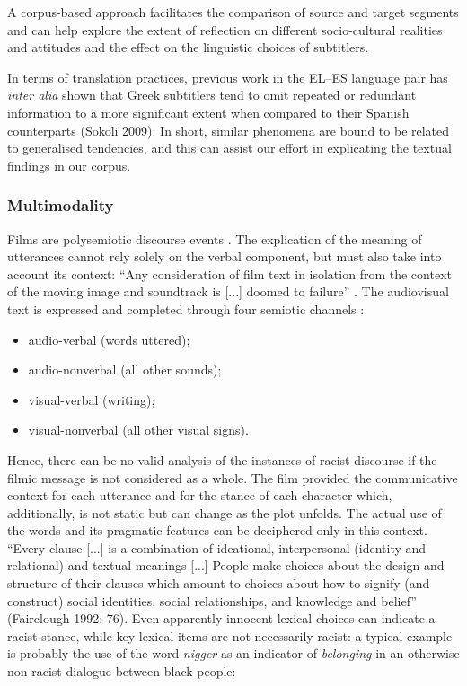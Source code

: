\documentclass[output=paper]{LSP/langsci}
\begin{document}
A corpus-based approach facilitates the comparison of source and target segments and can help explore the extent of reflection on different socio-cultural realities and attitudes and the effect on the linguistic choices of subtitlers.

In terms of translation practices, previous work in the EL--ES language pair has \textit{inter alia} shown that Greek subtitlers tend to omit repeated or redundant information to a more significant extent when compared to their Spanish counterparts (Sokoli 2009). In short, similar phenomena are bound to be related to generalised tendencies, and this can assist our effort in explicating the textual findings in our corpus.

\subsubsection{Multimodality}
Films are polysemiotic discourse events \citep{Gottlieb2005}. The explication of the meaning of utterances cannot rely solely on the verbal component, but must also take into account its context: “Any consideration of film text in isolation from the context of the moving image and soundtrack is [...] doomed to failure” \citep[23]{Mason2001}.
The audiovisual text is expressed and completed through four semiotic channels \citep{Zabalbeascoa2008}:

\begin{itemize}
\item audio-verbal (words uttered);
\item audio-nonverbal (all other sounds);
\item visual-verbal (writing);
\item visual-nonverbal (all other visual signs).
\end{itemize}

Hence, there can be no valid analysis of the instances of racist discourse if the filmic message is not considered as a whole. The film provided the communicative context for each utterance and for the stance of each character which, additionally, is not static but can change as the plot unfolds. The actual use of the words and its pragmatic features can be deciphered only in this context. “Every clause [...] is a combination of ideational, interpersonal (identity and relational) and textual meanings [...] People make choices about the design and structure of their clauses which amount to choices about how to signify (and construct) social identities, social relationships, and knowledge and belief” (Fairclough 1992: 76). Even apparently innocent lexical choices can indicate a racist stance, while key lexical items are not necessarily racist: a typical example is probably the use of the word \textit{nigger} as an indicator of \textit{belonging} in an otherwise non-racist dialogue between black people:
\end{document}
